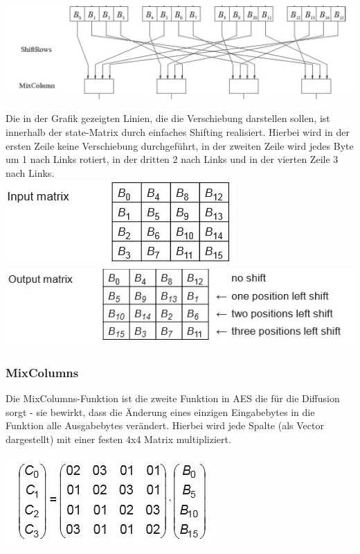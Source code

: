 \documentclass[10pt, a4paper,headsepline]{scrreprt}
\begin{document}
\includegraphics[scale=0.5]{aes_Shift_Row.JPG} 
\hfill

Die in der Grafik gezeigten Linien, die die Verschiebung darstellen sollen, ist innerhalb der state-Matrix durch einfaches Shifting realisiert. Hierbei wird in der ersten Zeile keine Verschiebung durchgeführt, in der zweiten Zeile wird jedes Byte um 1 nach Links rotiert, in der dritten 2 nach Links und in der vierten Zeile 3 nach Links. \\

\includegraphics[scale=0.5]{shift_row_before.JPG}
\includegraphics[scale=0.5]{shift_row_after.JPG} 
\hfill


\subsubsection{MixColumns}
Die MixColumns-Funktion ist die zweite Funktion in AES die für die Diffusion sorgt - sie bewirkt, dass die Änderung eines einzigen Eingabebytes in die Funktion alle Ausgabebytes verändert. Hierbei wird jede Spalte (als Vector dargestellt) mit einer festen 4x4 Matrix multipliziert. 

\includegraphics[scale=0.5]{aes_mixcol.JPG}
\hfill
\end{document}

